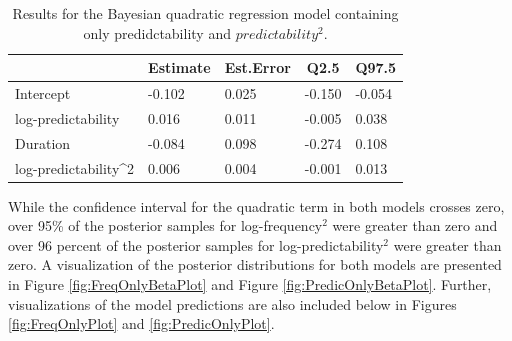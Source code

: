 \documentclass[
  man,floatsintext]{apa6}
\begin{document}
\begin{table}[H]

\begin{center}
\begin{threeparttable}

\caption{\label{tab:brmsPredic}Results for the Bayesian quadratic regression model containing only predidctability and \(predictability^2\).}

\begin{tabular}{lllll}
\toprule
 & \multicolumn{1}{c}{Estimate} & \multicolumn{1}{c}{Est.Error} & \multicolumn{1}{c}{Q2.5} & \multicolumn{1}{c}{Q97.5}\\
\midrule
Intercept & -0.102 & 0.025 & -0.150 & -0.054\\
log-predictability & 0.016 & 0.011 & -0.005 & 0.038\\
Duration & -0.084 & 0.098 & -0.274 & 0.108\\
log-predictability\textasciicircum{}2 & 0.006 & 0.004 & -0.001 & 0.013\\
\bottomrule
\end{tabular}

\end{threeparttable}
\end{center}

\end{table}

While the confidence interval for the quadratic term in both models crosses zero, over 95\% of the posterior samples for log-frequency\(^2\) were greater than zero and over 96 percent of the posterior samples for log-predictability\(^2\) were greater than zero. A visualization of the posterior distributions for both models are presented in Figure \ref{fig:FreqOnlyBetaPlot} and Figure \ref{fig:PredicOnlyBetaPlot}. Further, visualizations of the model predictions are also included below in Figures \ref{fig:FreqOnlyPlot} and \ref{fig:PredicOnlyPlot}.
\end{document}
